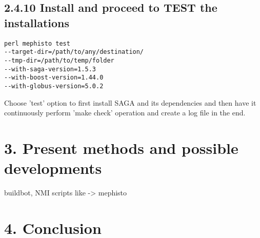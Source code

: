 \documentclass[a4paper,10pt]{article}
\begin{document}
\begin{multicols}{2}
\subsection*{\normalsize 2.4.10 Install and proceed to TEST the installations}
\begin{verbatim}
perl mephisto test 
--target-dir=/path/to/any/destination/ 
--tmp-dir=/path/to/temp/folder 
--with-saga-version=1.5.3 
--with-boost-version=1.44.0 
--with-globus-version=5.0.2
\end{verbatim}
Choose 'test' option to first install SAGA and its dependencies and then have it
continuously perform 'make check' operation and create a log file in the end.
\section*{\normalsize 3. Present methods and possible developments}
buildbot, NMI scripts like -> mephisto
\section*{\normalsize 4. Conclusion}

\end{multicols}
\end{document}
